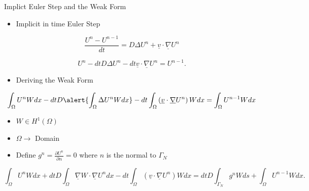 \documentclass[10pt]{beamer}
\begin{document}
\begin{frame}{Implict Euler Step and the Weak Form}  \label{EulerandWeak}

\begin{itemize}
\item Implicit in time Euler Step
\end{itemize}
\footnotesize
\begin{equation}
\frac{U^{n}-U^{n-1}}{dt}=D\Delta U^{n}+\underline{v} \cdot \underline{\nabla}U^{n}
\end{equation}

\begin{equation}
U^{n}-dtD\Delta U^{n}-dt\underline{v}\cdot \underline{\nabla}U^{n}=U^{n-1}.
\end{equation}
\normalsize
\begin{itemize}
\item Deriving the Weak Form
\end{itemize}
\footnotesize
\begin{equation}
\int_{\Omega}U^{n}W dx -dtD\alert{ \int_{\Omega}\Delta U^{n}W dx}-dt\int_{\Omega}\left(\underline{v}\cdot \underline{\nabla}U^{n}\right)W dx=\int_{\Omega} U^{n-1}W dx
\end{equation}

\begin{itemize}
\item $W \in H^{1}\left({\Omega}\right)$
\item $\Omega \rightarrow$ Domain
\item Define $g^{n}=\frac{\partial U^{n}}{\partial n}=0$ where $n$ is the normal to $\Gamma_{N}$
\end{itemize}

\begin{equation}
\int_{\Omega}U^{n}W dx +dtD\int_{\Omega}\underline{\nabla}W \cdot \underline{\nabla} U^{n} dx-dt\int_{\Omega}\left(\underline{v}\cdot \underline{\nabla}U^{n}\right)W dx=dtD\int_{\Gamma_{N}}g^{n}W ds+ \int_{\Omega} U^{n-1}W dx.
\end{equation}
\normalsize

\hyperlink{Questions}{}
\end{frame}
\end{document}
